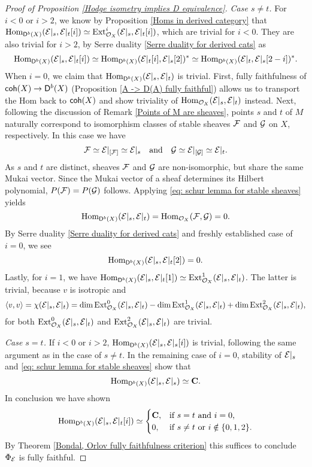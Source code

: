 \begin{proof}[Proof of Proposition \ref{Hodge isometry implies D equivalence}]
    \vspace{0.3cm}
    \noindent
    \textsl{Case $s \neq t$.}  
    For $i < 0$ or $i > 2$, we know by Proposition \ref{Homs in derived category} that $\operatorname{Hom}_{\mathsf{D}^b(X)}(\mathcal E|_s, \mathcal E|_t[i]) \simeq \operatorname{Ext}^i_{{\mathcal{O}_{X}}}(\mathcal E|_s, \mathcal E|_t[i])$, which are trivial for $i < 0$. They are also trivial for $i > 2$, by Serre duality \ref{Serre duality for derived cats} as
    \[
        \operatorname{Hom}_{\mathsf{D}^b(X)}(\mathcal E|_s, \mathcal E|_t[i]) \simeq \operatorname{Hom}_{\mathsf{D}^b(X)}(\mathcal E|_t[i], \mathcal E|_s[2])^* \simeq \operatorname{Hom}_{\mathsf{D}^b(X)}(\mathcal E|_t, \mathcal E|_s[2-i])^*.
    \]
    When $i = 0$, we claim that $\operatorname{Hom}_{\mathsf{D}^b(X)}(\mathcal E|_s, \mathcal E|_t)$ is trivial. First, fully faithfulness of $\mathsf{coh}(X) \to \mathsf{D}^b(X)$ (\cf Proposition \ref{A -> D(A) fully faithful}) allows us to transport the Hom back to $\mathsf{coh}(X)$ and show triviality of $\operatorname{Hom}_{{\mathcal{O}_{X}}}(\mathcal E|_s, \mathcal E|_t)$ instead. Next, following the discussion of Remark \ref{Points of M are sheaves}, points $s$ and $t$ of $M$ naturally correspond to isomorphism classes of stable sheaves $\mathcal F$ and $\mathcal G$ on $X$, respectively. In this case we have
    \[
        \mathcal F \simeq \mathcal E|_{[\mathcal F]} \simeq \mathcal E|_s \quad \text{and} \quad \mathcal G \simeq \mathcal E|_{[\mathcal G]} \simeq \mathcal E|_t.
    \]
    As $s$ and $t$ are distinct, sheaves $\mathcal F$ and $\mathcal G$ are non-isomorphic, but share the same Mukai vector. Since the Mukai vector of a sheaf determines its Hilbert polynomial, $P(\mathcal F) = P(\mathcal G)$ follows. Applying \eqref{eq: schur lemma for stable sheaves} yields 
    \[
        \operatorname{Hom}_{\mathsf{D}^b(X)}(\mathcal E|_s, \mathcal E|_t) = \operatorname{Hom}_{{\mathcal{O}_{X}}}(\mathcal F, \mathcal G)= 0. 
    \]
    By Serre duality \ref{Serre duality for derived cats} and freshly established case of $i = 0$, we see 
    \[
        \operatorname{Hom}_{\mathsf{D}^b(X)}(\mathcal E|_s, \mathcal E|_t[2]) = 0.
    \]
    Lastly, for $i = 1$, we have $\operatorname{Hom}_{\mathsf{D}^b(X)}(\mathcal E|_s, \mathcal E|_t[1]) \simeq \operatorname{Ext}^1_{\mathcal{O}_{X}}(\mathcal E|_s, \mathcal E|_t)$. The latter is trivial, because $v$ is isotropic and 
    \[
        \langle v, v \rangle = \chi(\mathcal E|_s, \mathcal E|_t) = \dim\operatorname{Ext}^0_{\mathcal{O}_{X}}(\mathcal E|_s, \mathcal E|_t) - \dim\operatorname{Ext}^1_{\mathcal{O}_{X}}(\mathcal E|_s, \mathcal E|_t) + \dim\operatorname{Ext}^2_{\mathcal{O}_{X}}(\mathcal E|_s, \mathcal E|_t),
    \]
    for both $\operatorname{Ext}^0_{\mathcal{O}_{X}}(\mathcal E|_s, \mathcal E|_t)$ and $\operatorname{Ext}^2_{\mathcal{O}_{X}}(\mathcal E|_s, \mathcal E|_t)$ are trivial.

    \vspace{0.3cm}
    \noindent
    \textsl{Case $s = t$.}
    If $i < 0$ or $i > 2$, $\operatorname{Hom}_{\mathsf{D}^b(X)}(\mathcal E|_s, \mathcal E|_s[i])$ is trivial, following the same argument as in the case of $s \neq t$. In the remaining case of $i = 0$, stability of $\mathcal E|_s$ and \eqref{eq: schur lemma for stable sheaves} show that 
    \[
        \operatorname{Hom}_{\mathsf{D}^b(X)}(\mathcal E|_s, \mathcal E|_s) \simeq \mathbf C.
    \]
    In conclusion we have shown
    \begin{equation}
            \operatorname{Hom}_{\mathsf{D}^b(X)}(\mathcal E|_s, \mathcal E|_t[i]) \simeq \begin{cases}
                \mathbf C, &\text{if $s = t$ and $i = 0$,} \\
                0, &\text{if $s \neq t$ or $i \notin \{0,1,2\}$.}
            \end{cases}
    \end{equation}
    By Theorem \ref{Bondal, Orlov fully faithfulness criterion} this suffices to conclude $\Phi_{\mathcal E}$ is fully faithful. 


\end{proof}
